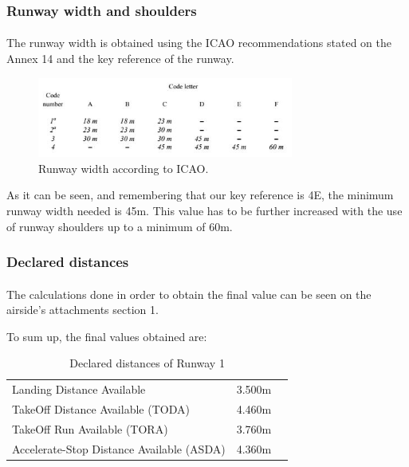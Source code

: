 			\subsubsection{Runway width and shoulders}
			\paragraph{}The runway width is obtained using the ICAO recommendations stated on the Annex 14 and the key reference of the runway. 
			
			\begin{figure}[H]
				\centering
				\includegraphics[clip, trim=0cm 0cm 0cm 0cm, width=0.75\textwidth]{./images/Annex14/RunwayWidth}
				\caption{Runway width according to ICAO.} %
				\label{} %
			\end{figure}
		
			As it can be seen, and remembering that our key reference is 4E, the minimum runway width needed is 45m. This value has to be further increased with the use of runway shoulders up to a minimum of 60m. 

			\subsubsection{Declared distances}
			\paragraph{} The calculations done in order to obtain the final value can be seen on the airside’s attachments section 1. 
			
			To sum up, the final values obtained are:
			
			\begin{table}[htb]
				\centering
				\begin{tabular}{ll p{5cm}}
					\midrule[2pt]
					Landing Distance Available & 3.500m\\
					TakeOff Distance Available (TODA) & 4.460m\\
					TakeOff Run Available (TORA)& 3.760m \\
					Accelerate-Stop Distance Available (ASDA)& 4.360m\\
					\bottomrule[2pt]
				\end{tabular}
				\caption{Declared distances of  Runway 1}
				\label{DeclareddistancesRW1}
			\end{table}
			
